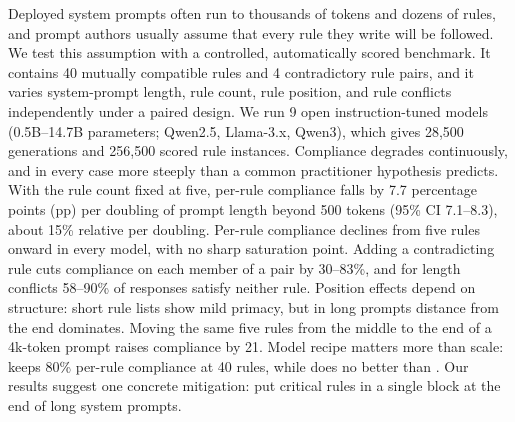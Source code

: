 Deployed system prompts often run to thousands of tokens and dozens of rules, and prompt authors usually assume that every rule they write will be followed.
We test this assumption with a controlled, automatically scored benchmark.
It contains 40 mutually compatible rules and 4 contradictory rule pairs, and it varies system-prompt length, rule count, rule position, and rule conflicts independently under a paired design.
We run 9 open instruction-tuned models (0.5B--14.7B parameters; Qwen2.5, Llama-3.x, Qwen3), which gives 28,500 generations and 256,500 scored rule instances.
Compliance degrades continuously, and in every case more steeply than a common practitioner hypothesis predicts.
With the rule count fixed at five, per-rule compliance falls by 7.7 percentage points (pp) per doubling of prompt length beyond 500 tokens (95\% CI 7.1--8.3), about 15\% relative per doubling.
Per-rule compliance declines from five rules onward in every model, with no sharp saturation point.
Adding a contradicting rule cuts compliance on each member of a pair by 30--83\%, and for length conflicts 58--90\% of responses satisfy neither rule.
Position effects depend on structure: short rule lists show mild primacy, but in long prompts distance from the end dominates.
Moving the same five rules from the middle to the end of a 4k-token prompt raises compliance by 21\pp.
Model recipe matters more than scale: \qwenthree keeps 80\% per-rule compliance at 40 rules, while \qfourteen does no better than \qseven.
Our results suggest one concrete mitigation: put critical rules in a single block at the end of long system prompts.
